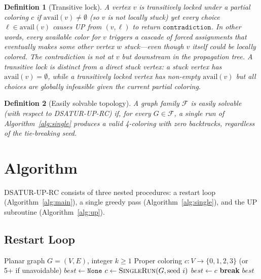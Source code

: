 \documentclass[11pt,twocolumn]{article}
\newtheorem{definition}{Definition}[section]
\begin{document}
\begin{definition}[Transitive lock]
\label{def:tlock}
A vertex $v$ is \emph{transitively locked} under a partial coloring $c$
if $\mathrm{avail}(v)\ne\emptyset$ (so $v$ is not locally stuck) yet every
choice $\ell\in\mathrm{avail}(v)$ causes UP from $(v,\ell)$ to return
$\mathtt{contradiction}$.  In other words, every available color for $v$
triggers a cascade of forced assignments that eventually makes some other
vertex $w$ stuck---even though $v$ itself could be locally colored.  The
contradiction is not at $v$ but \emph{downstream} in the propagation tree.
A transitive lock is distinct from a direct stuck vertex: a stuck vertex
has $\mathrm{avail}(v)=\emptyset$, while a transitively locked vertex has
non-empty $\mathrm{avail}(v)$ but all choices are globally infeasible
given the current partial coloring.
\end{definition}

\begin{definition}[Easily solvable topology]
\label{def:easy}
A graph family $\mathcal{F}$ is \emph{easily solvable} (with respect to
DSATUR-UP-RC) if, for every $G\in\mathcal{F}$, a single run of
Algorithm~\ref{alg:single} produces a valid 4-coloring with zero
backtracks, regardless of the tie-breaking seed.
\end{definition}

\section{Algorithm}
\label{sec:algorithm}

DSATUR-UP-RC consists of three nested procedures: a restart loop
(Algorithm~\ref{alg:main}), a single greedy pass
(Algorithm~\ref{alg:single}), and the UP subroutine
(Algorithm~\ref{alg:up}).

\subsection{Restart Loop}

\begin{algorithm}[t]
\caption{DSATUR-UP-RC}
\label{alg:main}
\begin{algorithmic}[1]
\Require Planar graph $G=(V,E)$, integer $k\geq 1$
\Ensure Proper coloring $c:V\to\{0,1,2,3\}$ (or 5+ if unavoidable)
\State $\mathit{best}\gets\mathtt{None}$
  \State $c\gets\Call{SingleRun}{G,\text{seed }i}$
    \State $\mathit{best}\gets c$
  \EndIf
   \textbf{break} \EndIf
\EndFor
\State \Return $\mathit{best}$
\end{algorithmic}
\end{algorithm}
\end{document}
